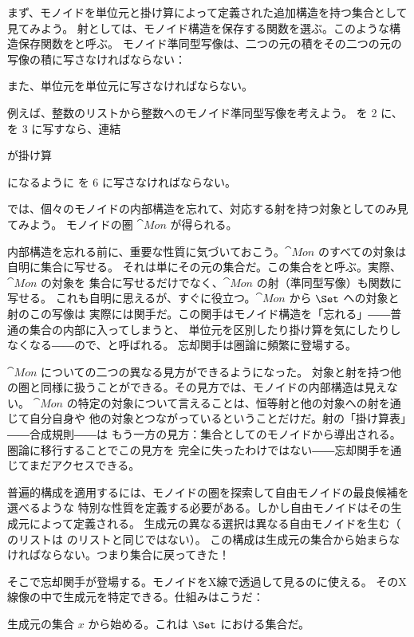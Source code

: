 まず、モノイドを単位元と掛け算によって定義された追加構造を持つ集合として見てみよう。
射としては、モノイド構造を保存する関数を選ぶ。このような構造保存関数をと呼ぶ。
モノイド準同型写像は、二つの元の積をその二つの元の写像の積に写さなければならない：

また、単位元を単位元に写さなければならない。

例えば、整数のリストから整数へのモノイド準同型写像を考えよう。
\code{{[}2{]}} を 2 に、\code{{[}3{]}} を 3 に写すなら、連結

が掛け算

になるように \code{{[}2, 3{]}} を 6 に写さなければならない。

では、個々のモノイドの内部構造を忘れて、対応する射を持つ対象としてのみ見てみよう。
モノイドの圏 $\cat{Mon}$ が得られる。

内部構造を忘れる前に、重要な性質に気づいておこう。$\cat{Mon}$ のすべての対象は自明に集合に写せる。
それは単にその元の集合だ。この集合をと呼ぶ。実際、$\cat{Mon}$ の対象を
集合に写せるだけでなく、$\cat{Mon}$ の射（準同型写像）も関数に写せる。
これも自明に思えるが、すぐに役立つ。$\cat{Mon}$ から $\Set$ への対象と射のこの写像は
実際には関手だ。この関手はモノイド構造を「忘れる」――普通の集合の内部に入ってしまうと、
単位元を区別したり掛け算を気にしたりしなくなる――ので、と呼ばれる。
忘却関手は圏論に頻繁に登場する。

$\cat{Mon}$ についての二つの異なる見方ができるようになった。
対象と射を持つ他の圏と同様に扱うことができる。その見方では、モノイドの内部構造は見えない。
$\cat{Mon}$ の特定の対象について言えることは、恒等射と他の対象への射を通じて自分自身や
他の対象とつながっているということだけだ。射の「掛け算表」――合成規則――は
もう一方の見方：集合としてのモノイドから導出される。圏論に移行することでこの見方を
完全に失ったわけではない――忘却関手を通じてまだアクセスできる。

普遍的構成を適用するには、モノイドの圏を探索して自由モノイドの最良候補を選べるような
特別な性質を定義する必要がある。しかし自由モノイドはその生成元によって定義される。
生成元の異なる選択は異なる自由モノイドを生む（ のリストは  のリストと同じではない）。
この構成は生成元の集合から始まらなければならない。つまり集合に戻ってきた！

そこで忘却関手が登場する。モノイドをX線で透過して見るのに使える。
そのX線像の中で生成元を特定できる。仕組みはこうだ：

生成元の集合 $x$ から始める。これは $\Set$ における集合だ。

